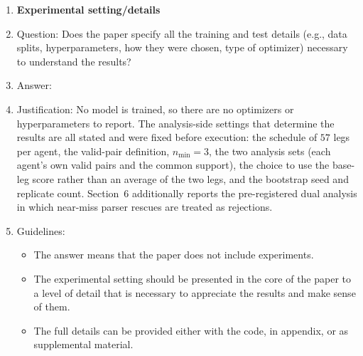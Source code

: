 \begin{enumerate}
\item {\bf Experimental setting/details}
    \item[] Question: Does the paper specify all the training and test details (e.g., data splits, hyperparameters, how they were chosen, type of optimizer) necessary to understand the results?
    \item[] Answer: \answerYes{}
    \item[] Justification: No model is trained, so there are no optimizers or hyperparameters to report. The analysis-side settings that determine the results are all stated and were fixed before execution: the schedule of $57$ legs per agent, the valid-pair definition, $n_{\min}=3$, the two analysis sets (each agent's own valid pairs and the common support), the choice to use the base-leg score rather than an average of the two legs, and the bootstrap seed and replicate count. Section~6 additionally reports the pre-registered dual analysis in which near-miss parser rescues are treated as rejections.
    \item[] Guidelines:
    \begin{itemize}
        \item The answer \answerNA{} means that the paper does not include experiments.
        \item The experimental setting should be presented in the core of the paper to a level of detail that is necessary to appreciate the results and make sense of them.
        \item The full details can be provided either with the code, in appendix, or as supplemental material.
    \end{itemize}


\end{enumerate}
